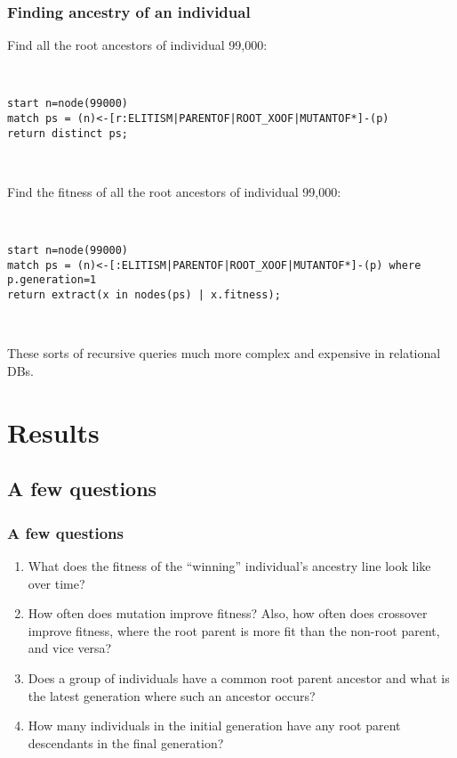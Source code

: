 \documentclass{beamer}
\begin{document}
\begin{frame}
\frametitle{Finding ancestry of an individual}

Find all the root ancestors of individual 99,000:

~

\texttt{start n=node(99000) \\
match ps = (n)<-[r:ELITISM|PARENTOF|ROOT\_XOOF|MUTANTOF*]-(p) \\
return distinct ps;
}

~

Find the fitness of all the root ancestors of individual 99,000:

~

\texttt{start n=node(99000) \\
match ps = (n)<-[:ELITISM|PARENTOF|ROOT\_XOOF|MUTANTOF*]-(p) where p.generation=1 \\
return extract(x in nodes(ps) | x.fitness);
}

~

These sorts of recursive queries much more complex and expensive in relational DBs.

\end{frame}

\section[Results]{Results}

\subsection{A few questions}

\begin{frame}
\frametitle{A few questions}
\begin{enumerate}
\item What does the fitness of the ``winning'' individual's ancestry line look like over time?
\item How often does mutation improve fitness? Also, how often does crossover improve fitness, where the root parent is more fit than the non-root parent, and vice versa?
\item Does a group of individuals have a common root parent ancestor and what is the latest generation where such an ancestor occurs?
\item How many individuals in the initial generation have any root parent descendants in the final generation?
\end{enumerate}
\end{frame}
\end{document}
